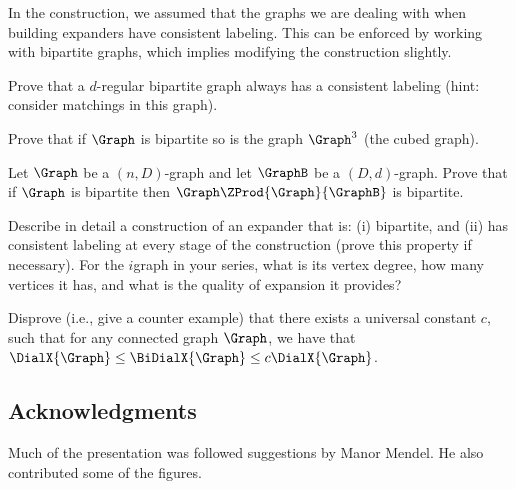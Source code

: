 \begin{exercise}
    In the construction, we assumed that the graphs we are dealing
    with when building expanders have consistent labeling.  This can
    be enforced by working with bipartite graphs, which implies
    modifying the construction slightly.
    \begin{compactenumA}
        \item Prove that a $d$-regular bipartite graph always has a
        consistent labeling (hint: consider matchings in this graph).

        \item Prove that if $\Graph$ is bipartite so is the graph
        $\Graph^3$ (the cubed graph).

        \item Let $\Graph$ be a $(n,D)$-graph and let $\GraphB$ be a
        $(D,d)$-graph. Prove that if $\Graph$ is bipartite then
        $\Graph \ZProd{\Graph}{\GraphB}$ is bipartite.

        \item Describe in detail a construction of an expander that
        is: (i) bipartite, and (ii) has consistent labeling at every
        stage of the construction (prove this property if necessary).
        For the $i$\th graph in your series, what is its vertex
        degree, how many vertices it has, and what is the quality of
        expansion it provides?
    \end{compactenumA}
\end{exercise}

\begin{exercise}

    Disprove (i.e., give a counter example) that there exists a
    universal constant $c$, such that for any connected graph
    $\Graph$, we have that $\DialX{\Graph} \leq \BiDialX{\Graph} \leq
    c \DialX{\Graph}$.
\end{exercise}




\subsection*{Acknowledgments}

Much of the presentation was followed suggestions by Manor Mendel. He
also contributed some of the figures.




% 
%

\ChapterEnd{}

 
